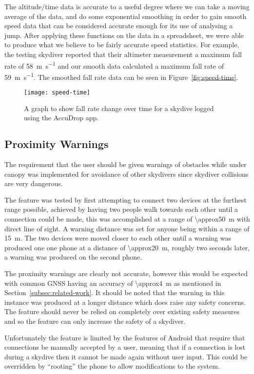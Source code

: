 The altitude/time data is accurate to a useful degree where we can take a moving average of the data, and do some exponential smoothing in order to gain smooth speed data that can be considered accurate enough for its use of analysing a jump. After applying these functions on the data in a spreadsheet, we were able to produce what we believe to be fairly accurate speed statistics. For example, the testing skydiver reported that their altimeter measurement a maximum fall rate of \SI{58}{\metre\per\second} and our smooth data calculated a maximum fall rate of \SI{59}{\metre\per\second}. The smoothed fall rate data can be seen in Figure~\vref{fig:speed-time}.

\begin{figure}[ht]
  \centering
  \texttt{[image: speed-time]}
  \caption{A graph to show fall rate change over time for a skydive logged using the AccuDrop app.}\label{fig:speed-time}
\end{figure}

\subsection{Proximity Warnings}
The requirement that the user should be given warnings of obstacles while under canopy was implemented for avoidance of other skydivers since skydiver collisions are very dangerous.

The feature was tested by first attempting to connect two devices at the furthest range possible, achieved by having two people walk towards each other until a connection could be made, this was accomplished at a range of \SI{\approx50}{\metre} with direct line of sight. A warning distance was set for anyone being within a range of \SI{15}{\metre}. The two devices were moved closer to each other until a warning was produced one one phone at a distance of \SI{\approx20}{\metre}, roughly two seconds later, a warning was produced on the second phone.

The proximity warnings are clearly not accurate, however this would be expected with common GNSS having an accuracy of \SI{\approx4}{\metre} as mentioned in Section~\ref{subsec:related-work}. It should be noted that the warning in this instance was produced at a longer distance which does raise any safety concerns. The feature should never be relied on completely over existing safety measures and so the feature can only increase the safety of a skydiver.

Unfortunately the feature is limited by the features of Android that require that connections be manually accepted by a user, meaning that if a connection is lost during a skydive then it cannot be made again without user input. This could be overridden by ``rooting'' the phone to allow modifications to the system.

